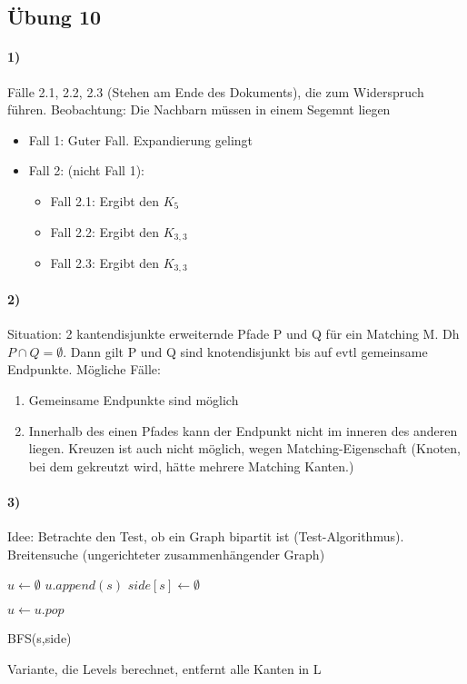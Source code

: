 \subsection{Übung 10}
\paragraph{1)} Fälle 2.1, 2.2, 2.3 (Stehen am Ende des Dokuments), die zum Widerspruch führen. Beobachtung: Die Nachbarn müssen in einem Segemnt liegen
\begin{itemize}
    \item[] Fall 1: Guter Fall. Expandierung gelingt
    \item[] Fall 2: (nicht Fall 1):
    \begin{itemize}
        \item[] Fall 2.1: Ergibt den $K_5$ 
        \item[] Fall 2.2: Ergibt den $K_{3,3}$ 
        \item[] Fall 2.3: Ergibt den $K_{3,3}$ 
    \end{itemize}
\end{itemize}

\paragraph{2)} Situation: 2 kantendisjunkte erweiternde Pfade P und Q für ein Matching M. Dh $ P \cap Q = \emptyset $. Dann gilt P und Q sind knotendisjunkt bis auf evtl gemeinsame Endpunkte. Mögliche Fälle:
\begin{enumerate}
    \item Gemeinsame Endpunkte sind möglich
    \item Innerhalb des einen Pfades kann der Endpunkt nicht im inneren des anderen liegen. Kreuzen ist auch nicht möglich, wegen Matching-Eigenschaft (Knoten, bei dem gekreutzt wird, hätte mehrere Matching Kanten.)
\end{enumerate}

\paragraph{3)} Idee: Betrachte den Test, ob ein Graph bipartit ist (Test-Algorithmus). Breitensuche (ungerichteter zusammenhängender Graph)

\begin{algorithm}[H]
\SetAlgoLined
$u \gets \emptyset$\;
$u.append(s)$\;
$side[s] \gets \emptyset$\;
 {
    $u \gets u.pop$\;

}


\caption{BFS(s,side)}
\end{algorithm}
Variante, die Levels berechnet, entfernt alle Kanten in L


